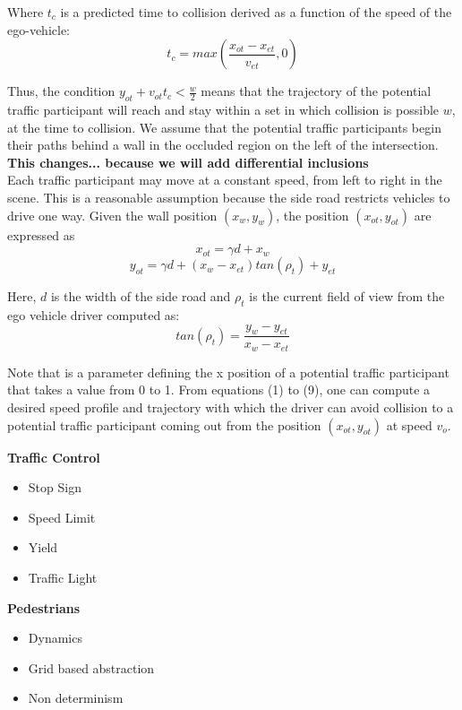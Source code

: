 \documentclass{easychair}
\theoremstyle{theorem}
\theoremstyle{remark}
\begin{document}
Where $t_c$  is a predicted time to collision derived as a function of the speed of the ego-vehicle:
\begin{equation}
t_c=max(\frac{x_{ot}-x_{et}}{v_{et}},0)
\end{equation}

Thus, the condition $y_{ot}+v_{ot}t_c < \frac{w}{2}$  means that the trajectory of the potential traffic participant will reach and stay within a set in which collision is possible $w$, at the time to collision. We assume that the potential traffic participants begin their paths behind a wall in the occluded region on the left of the intersection.\\
\textbf{This changes... because we will add differential inclusions}\\
Each traffic participant may move at a constant speed, from left to right in the scene. This is a reasonable assumption because the side road restricts vehicles to drive one way. Given the wall position $(x_w,y_w)$, the position $(x_{ot},y_{ot})$  are expressed as
\begin{equation}
x_{ot}=\gamma d + x_{w}
\end{equation}
\begin{equation}
y_{ot} = \gamma d + (x_w - x_{et})tan(\rho_t) +y_{et}
\end{equation}

Here, $d$ is the width of the side road and $\rho_t$ is the current field of view from the ego vehicle driver computed as:
\begin{equation}
tan(\rho_t) = \frac{y_w-y_{et}}{x_w - x_{et}}
\end{equation}

Note that   is a parameter defining the x position of a potential traffic participant that takes a value from 0 to 1. From equations (1) to (9), one can compute a desired speed profile and trajectory with which the driver can avoid collision to a potential traffic participant coming out from the position $(x_{ot},y_{ot})$ at speed $v_o$.


\noindent \textbf{Traffic Control}
\begin{itemize}
	\item Stop Sign
	\item Speed Limit
	\item Yield
	\item Traffic Light
\end{itemize}

\noindent \textbf{Pedestrians}
\begin{itemize}
	\item Dynamics
	\item Grid based abstraction
	\item Non determinism
\end{itemize}
\end{document}
